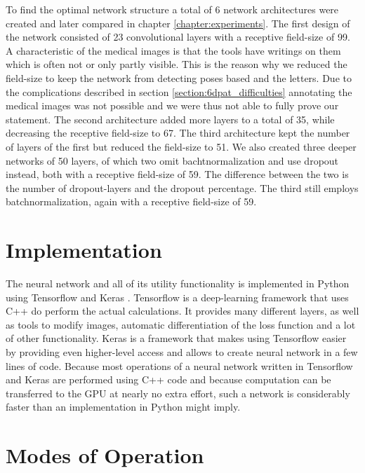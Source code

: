 To find the optimal network structure a total of 6 network architectures were created and later compared in chapter \ref{chapter:experiments}. The first design of the network consisted of 23 convolutional layers with a receptive field-size of 99. A characteristic of the medical images is that the tools have writings on them which is often not or only partly visible. This is the reason why we reduced the field-size to keep the network from detecting poses based and the letters. Due to the complications described in section \ref{section:6dpat_difficulties} annotating the medical images was not possible and we were thus not able to fully prove our statement. The second architecture added more layers to a total of 35, while decreasing the receptive field-size to 67. The third architecture kept the number of layers of the first but reduced the field-size to 51. We also created three deeper networks of 50 layers, of which two omit bachtnormalization and use dropout instead, both with a receptive field-size of 59. The difference between the two is the number of dropout-layers and the dropout percentage. The third still employs batchnormalization, again with a receptive field-size of 59.

\section{Implementation}

The neural network and all of its utility functionality is implemented in Python using Tensorflow \cite{tensorflow} and Keras \cite{keras}. Tensorflow is a deep-learning framework that uses C++ do perform the actual calculations. It provides many different layers, as well as tools to modify images, automatic differentiation of the loss function and a lot of other functionality. Keras is a framework that makes using Tensorflow easier by providing even higher-level access and allows to create neural network in a few lines of code. Because most operations of a neural network written in Tensorflow and Keras are performed using C++ code and because computation can be transferred to the GPU at nearly no extra effort, such a network is considerably faster than an implementation in Python might imply.

\section{Modes of Operation} \label{section:modes_of_operation}

